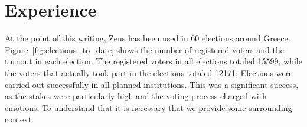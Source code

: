 \documentclass[jets]{usenixjournal}
\begin{document}






\section{Experience}
\label{sec:experience}

At the point of this writing, Zeus has been used in 60 elections
around Greece. Figure~\ref{fig:elections_to_date} shows the number of
registered voters and the turnout in each election. The registered
voters in all elections totaled 15599, while the voters that actually
took part in the elections totaled 12171; Elections were carried out
successfully in all planned institutions. This was a significant
success, as the stakes were particularly high and the voting process
charged with emotions. To understand that it is necessary that we
provide some surrounding context.
\end{document}
